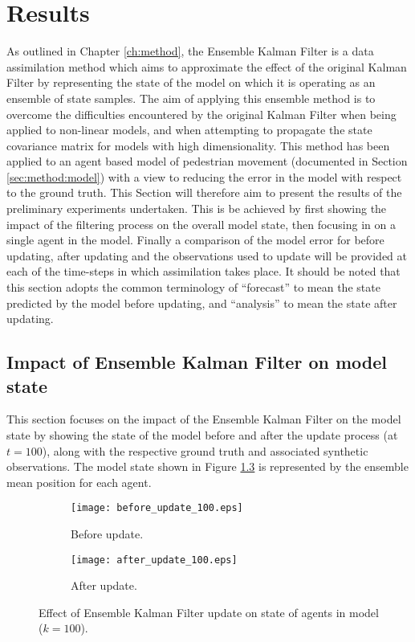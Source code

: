 \chapter{Results}\label{ch:results}

As outlined in Chapter \ref{ch:method}, the Ensemble Kalman Filter is a data
assimilation method which aims to approximate the effect of the original Kalman
Filter by representing the state of the model on which it is operating as an
ensemble of state samples.
The aim of applying this ensemble method is to overcome the difficulties
encountered by the original Kalman Filter when being applied to non-linear
models, and when attempting to propagate the state covariance matrix for models
with high dimensionality.
This method has been applied to an agent based model of pedestrian movement
(documented in Section \ref{sec:method:model}) with a view to reducing the error
in the model with respect to the ground truth.
This Section will therefore aim to present the results of the preliminary
experiments undertaken.
This is be achieved by first showing the impact of the filtering process on the
overall model state, then focusing in on a single agent in the model.
Finally a comparison of the model error for before updating, after updating and
the observations used to update will be provided at each of the time-steps in
which assimilation takes place.
It should be noted that this section adopts the common terminology of
``forecast'' to mean the state predicted by the model before updating, and
``analysis'' to mean the state after updating.

\section{Impact of Ensemble Kalman Filter on model
state}\label{sec:results:model}

This section focuses on the impact of the Ensemble Kalman Filter on the model
state by showing the state of the model before and after the update process (at
$t=100$), along with the respective ground truth and associated synthetic
observations.
The model state shown in Figure \ref{fig:enkf_abm} is represented by the
ensemble mean position for each agent.

\begin{figure}[h]
    \centering
    \begin{subfigure}[h]{\textwidth}
        \texttt{[image: before\_update\_100.eps]}
        \caption{Before update.}\label{fig:abm_before}
    \end{subfigure}

    \begin{subfigure}[h]{\textwidth}
        \texttt{[image: after\_update\_100.eps]}
        \caption{After update.}\label{fig:abm_after}
    \end{subfigure}
    \caption[Effect of Ensemle Kalman Filter update on state of
    model.]{\centering Effect of Ensemble Kalman Filter update on state of
    agents in model ($k=100$).}\label{fig:enkf_abm}
\end{figure}

